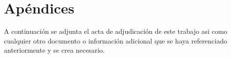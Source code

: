 \chapter{Apéndices}\label{apendices}

A continuación se adjunta el acta de adjudicación de este trabajo asi como cualquier otro documento o información adicional que se haya referenciado anteriormente y se crea necesario.


